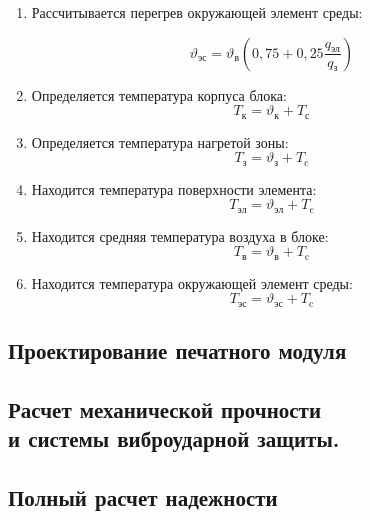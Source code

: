 \begin{enumerate}
\item Рассчитывается перегрев окружающей элемент среды:

    \begin{equation}
      \vartheta\mathrm{_{эс}} = \vartheta\mathrm{_в}
      \left(0,75 + 0,25\frac{q\mathrm{_{эл}}}{q\mathrm{_{з}}}\right)
    \end{equation}


\item Определяется температура корпуса блока:
    \begin{equation}
      T\mathrm{_к} = \vartheta\mathrm{_{к}} + T\mathrm{_с}
    \end{equation}

\item Определяется температура нагретой зоны:
    \begin{equation}
      T\mathrm{_з} = \vartheta\mathrm{_з} + T\mathrm{_c}
    \end{equation}


\item Находится температура поверхности элемента:
    \begin{equation}
      T\mathrm{_{эл}} = \vartheta\mathrm{_{эл}} + T\mathrm{_c}
    \end{equation}



\item Находится средняя температура воздуха в блоке:
    \begin{equation}
      T\mathrm{_{в}} = \vartheta\mathrm{_{в}} + T\mathrm{_c}
    \end{equation}



\item Находится температура окружающей элемент среды:
    \begin{equation}
      T\mathrm{_{эс}} = \vartheta\mathrm{_{эс}} + T\mathrm{_c}
    \end{equation}

\end{enumerate}
 

 

\subsection{Проектирование печатного модуля}

% 
% 

\subsection{Расчет механической прочности \\
  и системы виброударной защиты.}

\subsection{Полный расчет надежности}

\newpage

